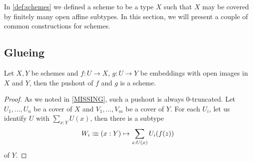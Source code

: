 In \cref{def:schemes} we defined a scheme to be a type $X$ such that $X$
may be covered by finitely many open affine subtypes.
In this section, we will present a couple of common constructions for schemes.

\subsection{Glueing}
\begin{proposition}%
  Let $X,Y$ be schemes and $f:U\to X$, $g:U\to Y$ be embeddings with open images in $X$ and $Y$,
  then the pushout of $f$ and $g$ is a scheme.
\end{proposition}
\begin{proof}
  As we noted in \cref{MISSING}, such a pushout is always 0-truncated.
  Let $U_1,\dots,U_n$ be a cover of $X$ and $V_1,\dots,V_m$ be a cover of $Y$.
  For each $U_i$, let us identify $U$ with $\sum_{x:Y}U(x)$, then there is a subtype
  \[ W_i\vcentcolon\mspace{-1.2mu}\equiv (x:Y)\mapsto \sum_{z:U(x)}U_i(f(z)) \]
  of $Y$.
\end{proof}